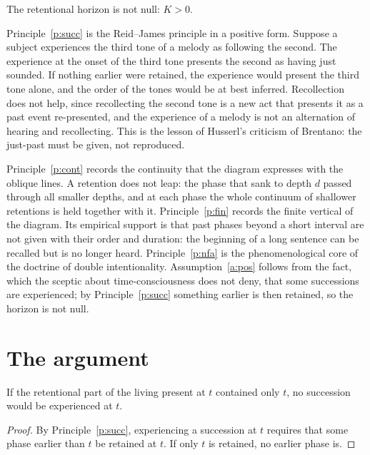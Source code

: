 \documentclass{situationist-preprint}
\begin{document}
\begin{assumption}\label{a:pos}
The retentional horizon is not null: $K>0$.
\end{assumption}

Principle~\ref{p:succ} is the Reid--James principle in a positive form. Suppose a subject experiences the third tone of a melody as following the second. The experience at the onset of the third tone presents the second as having just sounded. If nothing earlier were retained, the experience would present the third tone alone, and the order of the tones would be at best inferred. Recollection does not help, since recollecting the second tone is a new act that presents it as a past event re-presented, and the experience of a melody is not an alternation of hearing and recollecting. This is the lesson of Husserl's criticism of Brentano: the just-past must be given, not reproduced.

Principle~\ref{p:cont} records the continuity that the diagram expresses with the oblique lines. A retention does not leap: the phase that sank to depth $d$ passed through all smaller depths, and at each phase the whole continuum of shallower retentions is held together with it. Principle~\ref{p:fin} records the finite vertical of the diagram. Its empirical support is that past phases beyond a short interval are not given with their order and duration: the beginning of a long sentence can be recalled but is no longer heard. Principle~\ref{p:nfa} is the phenomenological core of the doctrine of double intentionality. Assumption~\ref{a:pos} follows from the fact, which the sceptic about time-consciousness does not deny, that some successions are experienced; by Principle~\ref{p:succ} something earlier is then retained, so the horizon is not null.

\section{The argument}\label{s:argument}

\begin{lemma}\label{l:instant}
If the retentional part of the living present at $t$ contained only $t$, no succession would be experienced at $t$.
\end{lemma}

\begin{proof}
By Principle~\ref{p:succ}, experiencing a succession at $t$ requires that some phase earlier than $t$ be retained at $t$. If only $t$ is retained, no earlier phase is.
\end{proof}
\end{document}
